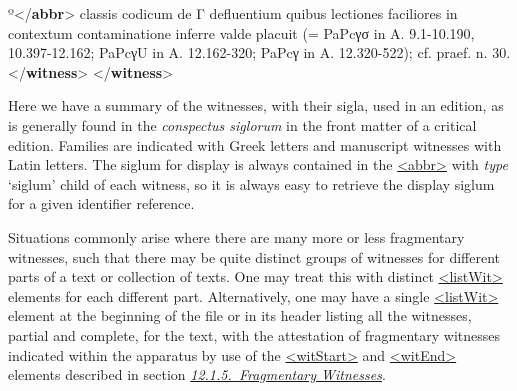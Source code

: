 \begin{shaded}
\hspace*{1em}\hspace*{1em}\hspace*{1em}\mbox{}\newline 
\hspace*{1em}\hspace*{1em}\hspace*{1em}\mbox{}\newline 
\hspace*{1em}\hspace*{1em}\hspace*{1em}\hspace*{1em}º{</\textbf{abbr}>} classis codicum de Γ defluentium quibus lectiones faciliores in contextum contaminatione inferre valde placuit (= PaPcγσ in A. 9.1-10.190, 10.397-12.162; PaPcγU in A. 12.162-320; PaPcγ in A. 12.320-522); cf. praef. n. 30.{</\textbf{witness}>}\mbox{}\newline 
\hspace*{1em}\hspace*{1em}\mbox{}\newline 
\hspace*{1em}\mbox{}\newline 
{}\mbox{}\newline 
{</\textbf{witness}>}\end{shaded}\egroup\par \noindent  Here we have a summary of the witnesses, with their sigla, used in an edition, as is generally found in the \textit{conspectus siglorum} in the front matter of a critical edition. Families are indicated with Greek letters and manuscript witnesses with Latin letters. The siglum for display is always contained in the \hyperref[TEI.abbr]{<abbr>} with {\itshape type} ‘siglum’ child of each witness, so it is always easy to retrieve the display siglum for a given identifier reference.\par
Situations commonly arise where there are many more or less fragmentary witnesses, such that there may be quite distinct groups of witnesses for different parts of a text or collection of texts. One may treat this with distinct \hyperref[TEI.listWit]{<listWit>} elements for each different part. Alternatively, one may have a single \hyperref[TEI.listWit]{<listWit>} element at the beginning of the file or in its header listing all the witnesses, partial and complete, for the text, with the attestation of fragmentary witnesses indicated within the apparatus by use of the \hyperref[TEI.witStart]{<witStart>} and \hyperref[TEI.witEnd]{<witEnd>} elements described in section \textit{\hyperref[TCAPMI]{12.1.5.\ Fragmentary Witnesses}}.\par
